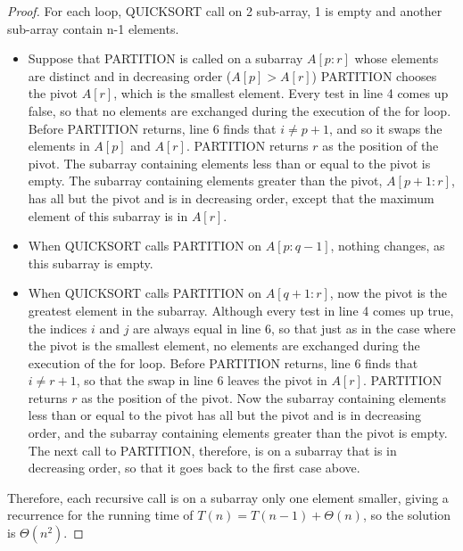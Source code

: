 \documentclass{article}
\begin{document}
\begin{proof}
%

For each loop, QUICKSORT call on 2 sub-array, 1 is empty and another sub-array contain n-1 elements.

\begin{itemize}

\item 
    Suppose that PARTITION is called on a subarray $A[p:r]$ 
    whose elements are distinct and in decreasing order ($A[p] > A[r]$)
    PARTITION chooses the pivot $A[r]$, which is the smallest element.
    Every test in line 4 comes up false, so that no elements are exchanged during the execution of the for loop. 
    Before PARTITION returns, line 6 finds that $i \neq p + 1$, 
    and so it swaps the elements in $A[p]$ and $A[r]$. 
    PARTITION returns $r$ as the position of the pivot. 
    The subarray containing elements less than or equal to the pivot is empty. 
    The subarray containing elements greater than the pivot, $A[p+1:r]$, 
    has all but the pivot and is in decreasing order, 
    except that the maximum element of this subarray is in $A[r]$.

\item 
    When QUICKSORT calls PARTITION on $A[p:q-1]$, nothing changes, 
    as this subarray is empty. 
\item 
    When QUICKSORT calls PARTITION on $A[q+1:r]$, now the pivot is the greatest element in the subarray. 
    Although every test in line 4 comes up true, the indices $i$ and $j$ are always equal in line 6, 
    so that just as in the case where the pivot is the smallest element, 
    no elements are exchanged during the execution of the for loop. 
    Before PARTITION returns, line 6 finds that $i \neq r + 1$, 
    so that the swap in line 6 leaves the pivot in $A[r]$. 
    PARTITION returns $r$ as the position of the pivot. 
    Now the subarray containing elements less than or equal to the pivot has all but the pivot and is in decreasing order, 
    and the subarray containing elements greater than the pivot is empty. 
    The next call to PARTITION, therefore, is on a subarray that is in decreasing order, 
    so that it goes back to the first case above.

\end{itemize}
Therefore, each recursive call is on a subarray only one element smaller, 
giving a recurrence for the running time of $T(n) = T(n-1) + \Theta(n)$, 
so the solution is $\Theta(n^2)$.
\end{proof}
\end{document}
